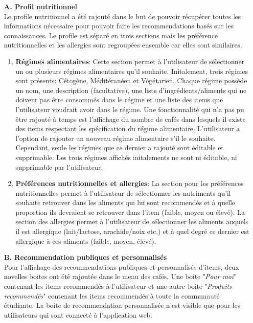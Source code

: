 \documentclass[11pt]{article}
\begin{document}
\textbf{A. Profil nutritionnel}\\
\label{profileNutritionnel}
Le profile nutritionnel a été rajouté dans le but de pouvoir récupérer toutes les informations nécessaire pour pouvoir faire les recommendations basés sur les connaissances. Le profile est séparé en trois sections mais les préférence nutritionnelles et les allergies sont regroupées ensemble car elles sont similaires. \\

\begin{enumerate}
	\item \textbf{Régimes alimentaires}: Cette section permet à l'utilisateur de sélectionner un ou plusieurs régimes alimentaires qu'il souhaite. Initalement, trois régimes sont présents: Cétogène, Méditéranéen et Végétarien. Chaque régime possède un nom, une description (facultative), une liste d'ingrédients/aliments qui ne doivent pas être consommés dans le régime et une liste des items que l'utilisateur voudrait avoir dans le régime. Une fonctionnalité qui n'a pas pu être rajouté à temps est l'affichage du nombre de cafés dans lesquels il existe des items respectant les spécification du régime alimentaire. L'utilisateur a l'option de rajouter un nouveau régime alimentaire s'il le souhaite. Cependant, seule les régimes que ce dernier a rajouté sont éditable et supprimable. Les trois régimes affichés initalements ne sont ni éditable, ni supprimable par l'utilisateur.\\
	
	 \item \textbf{Préférences nutritionnelles et allergies}: La section pour les préférences nutritionnelles permet à l'utilisateur de sélectionner les nutriments qu'il souhaite retrouver dans les aliments qui lui sont recommendés et à quelle proportion ils devraient se retrouver dans l'item (faible, moyen ou élevé). La section des allergies permet à l'utilisateur de sélectionner les aliments auquels il est allergique (lait/lactose, arachide/noix etc.) et à quel degré ce dernier est allergique à ces aliments (faible, moyen, élevé).\\
\end{enumerate}

\textbf{B. Recommendation publiques et personnalisés}\\
Pour l'affichage des recommendations publiques et personnalisés d'items, deux novelles boites ont été rajoutée dans le menu des cafés. Une boite "\textit{Pour moi}" contenant les items recommendés à l'utilisateur et une autre boite "\textit{Produits recommendés}" contenant les items recommendés à toute la communauté étudiante. La boite de recommendation personnalisée n'est visible que pour les utilisateurs qui sont connecté à l'application web.\\
\end{document}
